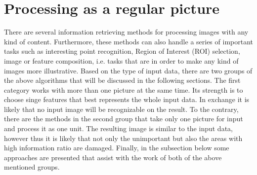 \documentclass[draft,final]{vutinfth} %
\begin{document}
\section{Processing as a regular picture}
There are several information retrieving methods for processing images with any kind of content.
Furthermore, these methods can also handle a series of important tasks such as interesting point recognition, Region of Interest (ROI) selection, image or feature composition, i.e. tasks that are in order to make any kind of images more illustrative.
Based on the type of input data, there are two groups of the above algorithms that will be discussed in the following sections.
The first category works with more than one picture at the same time.
Its strength is to choose singe features that best represents the whole input data. 
In exchange it is likely that no input image will be recognizable on the result.
To the contrary, there are the methods in the second group that take only one picture for input and process it as one unit.
The resulting image is similar to the input data, however thus it is likely that not only the unimportant but also the areas with high information ratio are damaged.
Finally, in the subsection below some approaches are presented that assist with the work of both of the above mentioned groups.
\end{document}
